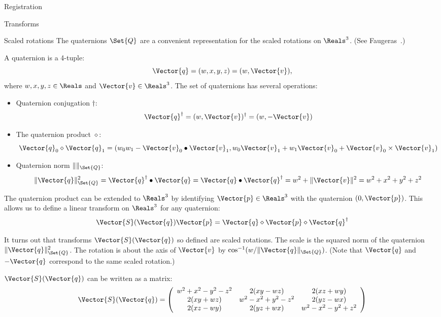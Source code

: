 \begin{plSection}{Registration}
\begin{plSection}{Transforms}
\begin{plSection}{Scaled rotations}
The quaternions $\Set{Q}$ are a convenient representation
for the scaled rotations on $\Reals^3$.
(See Faugeras~\cite[sec.~5.5.2]{Faugeras:1993:3dVision}.)

A quaternion is a 4-tuple:
\begin{equation}
\Vector{q} = (w, x, y, z) = (w, \Vector{v}),
\end{equation}
where $w, x, y, z \in \Reals$ and $\Vector{v} \in \Reals^3$.
The set of quaternions has several operations:
\begin{itemize}
\item Quaternion conjugation $\dagger$:
\begin{equation}
\Vector{q}^\dagger = (w, \Vector{v})^\dagger = (w, - \Vector{v})
\end{equation}
\item The quaternion product $\diamond$:
\begin{equation}
\Vector{q}_0 \diamond \Vector{q}_1 = (w_0w_1 - \Vector{v}_0 \bullet \Vector{v}_1, w_0 \Vector{v}_1 + w_1 \Vector{v}_0 + \Vector{v}_0 \times \Vector{v}_1)
\end{equation}
\item Quaternion norm $\| \|_{\Set{Q}}$:
\begin{equation}
\| \Vector{q} \|_{\Set{Q}}^2
= \Vector{q}^\dagger \bullet \Vector{q}
= \Vector{q} \bullet \Vector{q}^\dagger
= w^2 + \|\Vector{v}\|^2
= w^2 + x^2 + y^2 + z^2
\end{equation}
\end{itemize}

The quaternion product can be extended to $\Reals^3$
by identifying $\Vector{p} \in \Reals^3$ with
the quaternion $(0,\Vector{p})$.
This allows us to define a linear transform
on $\Reals^3$ for any quaternion:
\begin{equation}
\Vector{S}(\Vector{q}) \Vector{p} = \Vector{q} \diamond \Vector{p} \diamond \Vector{q}^\dagger
\end{equation}

It turns out that transforms $\Vector{S}(\Vector{q})$ so defined are scaled rotations.
The scale is the squared norm of the quaternion $\| \Vector{q} \|_{\Set{Q}}^2$.
The rotation is about the axis of $\Vector{v}$
by $\cos^{-1}(w / \| \Vector{q} \|_{\Set{Q}})$.
(Note that $\Vector{q}$ and $-\Vector{q}$ correspond to the same scaled rotation.)

$\Vector{S}(\Vector{q})$ can be written as a matrix:
\begin{equation}
\label{eq:quaternion-matrix}
\Vector{S}(\Vector{q}) =
\left(
\begin{array}{ccc}
w^2 + x^2 - y^2 - z^2 & 2(xy - wz)            & 2(xz + wy)           \\
2(xy + wz)            & w^2 - x^2 + y^2 - z^2 & 2(yz - wx)           \\
2(xz - wy)            & 2(yz + wx)            & w^2 - x^2 - y^2 +z^2
\end{array}
\right)
\end{equation}


\end{plSection}
\end{plSection}
\end{plSection}
